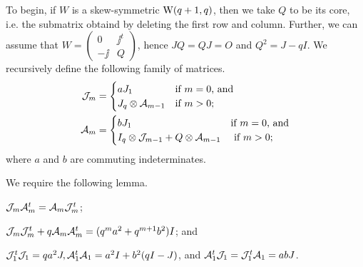 \documentclass[../../../main]{subfiles}
\begin{document}
To begin, if $W$ is a skew-symmetric $\text{W}(q+1,q)$, then we take $Q$ to be its core, i.e. the submatrix obtaind by deleting the first row and column. Further, we can assume that $W=\left(\begin{smallmatrix} 0 & \jj^t \\ -\jj & Q \end{smallmatrix}\right)$, hence $JQ=QJ=O$ and $Q^2=J-qI$. We recursively define the following family of matrices.
\begin{align*}
 \mathcal{J}_m&=\begin{cases}
        aJ_1 & \text{if $m=0$, and} \\
        J_q \otimes \mathcal{A}_{m-1} & \text{if $m>0$;}
       \end{cases} \\
 \mathcal{A}_m&=\begin{cases}
      bJ_1 & \text{if $m=0$, and} \\
      I_q \otimes \mathcal{J}_{m-1} + Q \otimes \mathcal{A}_{m-1} & \text{ if $m>0$;}
     \end{cases}
\end{align*}
where $a$ and $b$ are commuting indeterminates.

We require the following lemma.

\begin{lem}
 \begin{defenum}
  \item[]
  \item\label{lem-am-1} $\mathcal{J}_m\mathcal{A}_m^t = \mathcal{A}_m\mathcal{J}_m^t$;
  \item\label{lem-am-2} $\mathcal{J}_m\mathcal{J}_m^t + q\mathcal{A}_m\mathcal{A}_m^t = (q^ma^2+q^{m+1}b^2)I$; and
  \item\label{lem-am-3} $\mathcal{J}_1^t\mathcal{J}_1 = qa^2J, \mathcal{A}_1^t\mathcal{A}_1=a^2I+b^2(qI-J)$, and $\mathcal{A}_1^t\mathcal{J}_1=\mathcal{J}_1^t\mathcal{A}_1=abJ$.
 \end{defenum}
\end{lem}
\end{document}
